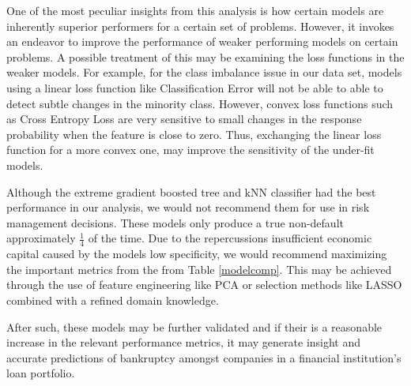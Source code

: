 \documentclass[12pt]{report}
\begin{document}
One of the most peculiar insights from this analysis is how certain models are inherently superior performers for a certain set of problems. However, it invokes an endeavor to improve the performance of weaker performing models on certain problems. A possible treatment of this may be examining the loss functions in the weaker models. For example, for the class imbalance issue in our data set, models using a linear loss function like Classification Error will not be able to able to detect subtle changes in the minority class. However, convex loss functions such as Cross Entropy Loss are very sensitive to small changes in the response probability when the feature is close to zero. Thus, exchanging the linear loss function for a more convex one, may improve the sensitivity of the under-fit models.

Although the extreme gradient boosted tree and kNN classifier had the best performance in our analysis, we would not recommend them for use in risk management decisions. These models only produce a true non-default approximately $\frac{1}{4}$ of the time. Due to the repercussions insufficient economic capital caused by the models low specificity, we would recommend maximizing the important metrics from the from Table \ref{modelcomp}. This may be achieved through the use of feature engineering like PCA or selection methods like LASSO combined with a refined domain knowledge. 

After such, these models may be further validated and if their is a reasonable increase in the relevant performance metrics, it may generate insight and accurate predictions of bankruptcy amongst companies in a financial institution's loan portfolio. 
\end{document}
